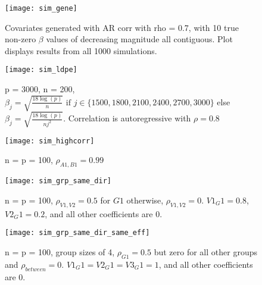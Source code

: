 \begin{figure}[hbtp]
    \begin{center}
    \texttt{[image: sim\_gene]}
    \caption{\label{Fig:sim_gene} Covariates generated with AR corr with rho = 0.7, with 10 true non-zero $\beta$ values of decreasing magnitude all contiguous. Plot displays results from all 1000 simulations.}
    \end{center}
\end{figure}

\begin{figure}[hbtp]
    \begin{center}
    \texttt{[image: sim\_ldpe]}
    \caption{\label{Fig:sim_ldpe} p = 3000, n = 200, $\beta_j = \sqrt{\frac{18\log(p)}{n}} \text{ if } j \in \lbrace 1500, 1800, 2100, 2400, 2700, 3000 \rbrace$ else $\beta_j = \sqrt{\frac{18\log(p)}{nj^2}}$. Correlation is autoregressive with $\rho = 0.8$}
    \end{center}
\end{figure}


\begin{figure}[hbtp]
    \begin{center}
    \texttt{[image: sim\_highcorr]}
    \caption{\label{Fig:sim_highcorr} n = p = 100, $\rho_{A1, B1} = 0.99$}
    \end{center}
\end{figure}

\begin{figure}[hbtp]
    \begin{center}
    \texttt{[image: sim\_grp\_same\_dir]}
    \caption{\label{Fig:sim_grp_same_dir} n = p = 100, $\rho_{V1, V2} = 0.5$ for $G1$ otherwise, $\rho_{V1, V2} = 0$. $V1_G1 = 0.8$, $V2_G1 = 0.2$, and all other coefficients are 0.}
    \end{center}
\end{figure}

\begin{figure}[hbtp]
    \begin{center}
    \texttt{[image: sim\_grp\_same\_dir\_same\_eff]}
    \caption{\label{Fig:ssim_grp_same_dir_same_eff} n = p = 100, group sizes of 4, $\rho_{G1} = 0.5$ but zero for all other groups and $\rho_{between} = 0$. $V1_G1 = V2_G1 = V3_G1 = 1$, and all other coefficients are 0.}
    \end{center}
\end{figure}